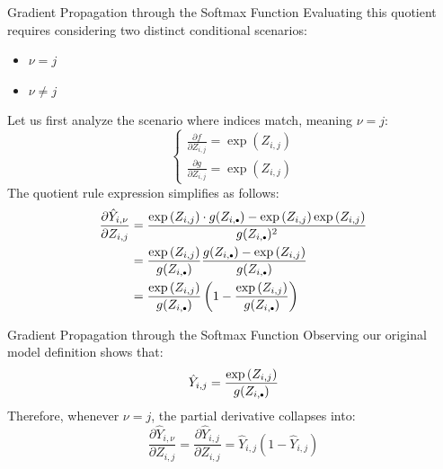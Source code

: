 \begin{frame}{Gradient Propagation through the Softmax Function}
	Evaluating this quotient requires considering two distinct conditional scenarios:
	\begin{itemize}
	\item $\nu = j$
	\item $\nu \ne j$
	\end{itemize}
	\pause
	Let us first analyze the scenario where indices match, meaning $\nu = j$:
	\begin{equation*}
	\begin{cases}
		\frac{\partial{f}}{\partial{Z_{i,j}}} = \exp{(Z_{i,j})} \\
		\frac{\partial{g}}{\partial{Z_{i,j}}} = \exp{(Z_{i,j})}
	\end{cases}
	\end{equation*}
	\pause
	The quotient rule expression simplifies as follows:
	\begin{equation*}
		\begin{aligned}
			\frac{\partial{\hat{Y}_{i,\nu}}}{\partial{Z_{i,j}}}
			&= \frac{\exp{(Z_{i,j})} \cdot g(Z_{i,\bigdot}) - \exp{(Z_{i,j})} \exp{(Z_{i,j})}}{g(Z_{i,\bigdot})^2} \\
			&= \frac{\exp{(Z_{i,j})}}{g(Z_{i,\bigdot})} \frac{g(Z_{i,\bigdot}) - \exp{(Z_{i,j})}}{g(Z_{i,\bigdot})} \\
			&= \frac{\exp{(Z_{i,j})}}{g(Z_{i,\bigdot})} \left(1 - \frac{\exp{(Z_{i,j})}}{g(Z_{i,\bigdot})}\right)
		\end{aligned}
	\end{equation*}
\end{frame}

\begin{frame}{Gradient Propagation through the Softmax Function}
	Observing our original model definition shows that:
	\begin{equation*}
		\hat{Y}_{i,j} = \frac{\exp{(Z_{i,j})}}{g(Z_{i,\bigdot})}
	\end{equation*}
	\pause
	Therefore, whenever $\nu = j$, the partial derivative collapses into:
	\begin{equation*}
		\frac{\partial{\hat{Y}_{i,\nu}}}{\partial{Z_{i,j}}} = \frac{\partial{\hat{Y}_{i,j}}}{\partial{Z_{i,j}}} = \hat{Y}_{i,j} \left(1 - \hat{Y}_{i,j}\right)
	\end{equation*}	
\end{frame}


